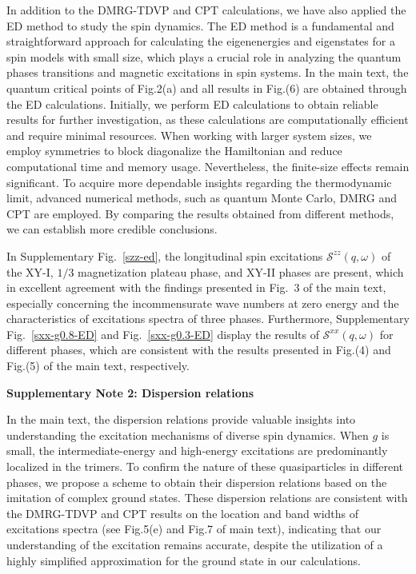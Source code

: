 \documentclass[aps,prx,showpacs,floatfix,twocolumn,superscriptaddress,nofootinbib,longbibliography]{revtex4-2}
\begin{document}
  In addition to the DMRG-TDVP and CPT calculations, we have also applied the ED method to study the spin dynamics. The ED method is a fundamental and straightforward approach for calculating the eigenenergies and eigenstates for a spin models with small size, which plays a crucial role in analyzing  the quantum phases transitions and magnetic excitations in spin systems. In the main text,    the quantum critical points of Fig.2(a) and  all results in Fig.(6)  are obtained through the ED calculations. Initially,  we perform ED calculations to obtain reliable results for further investigation, as these calculations are computationally efficient and require minimal resources. When working with larger system sizes, we employ symmetries to block diagonalize the Hamiltonian and reduce computational time and memory usage. Nevertheless,   the  finite-size effects remain significant. To acquire more dependable insights regarding the thermodynamic limit, advanced numerical methods, such as quantum Monte Carlo, DMRG and CPT are employed. By comparing the results obtained from different methods,  we can establish more credible conclusions.  
  
  In  Supplementary Fig.~\ref{szz-ed}, the longitudinal spin excitations $\mathcal{S}^{zz}  (q,\omega) $  of the XY-I, $1/3 $ magnetization  plateau phase, and XY-II phases are present, which  in excellent agreement with the findings presented  in Fig.~{3} of the main text, especially concerning the incommensurate wave numbers at zero energy and the   characteristics of excitations spectra of three phases. Furthermore, Supplementary Fig.~\ref{sxx-g0.8-ED} and Fig.~\ref{sxx-g0.3-ED} display the results of $\mathcal{S}^{xx}  (q,\omega) $ for  different phases,  which are consistent with the results presented  in Fig.(4) and Fig.(5) of the main text, respectively.
  
  \begin{center}
	{\centering \bf Supplementary Note 2: Dispersion relations}
	\end{center}

  In the main text, the dispersion relations provide valuable insights into understanding the excitation mechanisms of diverse spin dynamics. When $g$ is small, the intermediate-energy and high-energy excitations are predominantly localized in the trimers. To confirm the nature of these quasiparticles in different phases, we propose a scheme to obtain their dispersion relations based on the imitation of complex ground states.  These dispersion relations are consistent  with the DMRG-TDVP and CPT results on the location and band widths of excitations spectra (see Fig.5(e) and Fig.7 of main text), indicating that our understanding of the excitation remains accurate, despite the utilization of a highly simplified approximation for the ground state in our calculations. 
  
\end{document}
